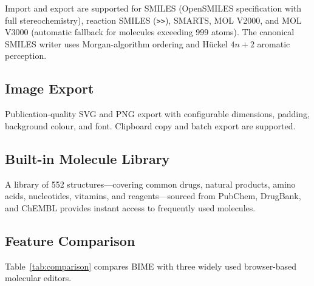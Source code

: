 \documentclass[twocolumn]{article}
\begin{document}
Import and export are supported for SMILES (OpenSMILES specification
with full stereochemistry), reaction SMILES (\texttt{>>}), SMARTS, MOL
V2000, and MOL V3000 (automatic fallback for molecules exceeding 999
atoms).  The canonical SMILES writer uses Morgan-algorithm ordering and
H\"uckel $4n+2$ aromatic perception.

\subsection{Image Export}

Publication-quality SVG and PNG export with configurable dimensions,
padding, background colour, and font.  Clipboard copy and batch export
are supported.

\subsection{Built-in Molecule Library}

A library of 552 structures---covering common drugs, natural products,
amino acids, nucleotides, vitamins, and reagents---sourced from PubChem,
DrugBank, and ChEMBL provides instant access to frequently used
molecules.

\subsection{Feature Comparison}

Table~\ref{tab:comparison} compares BIME with three widely used
browser-based molecular editors.
\end{document}

